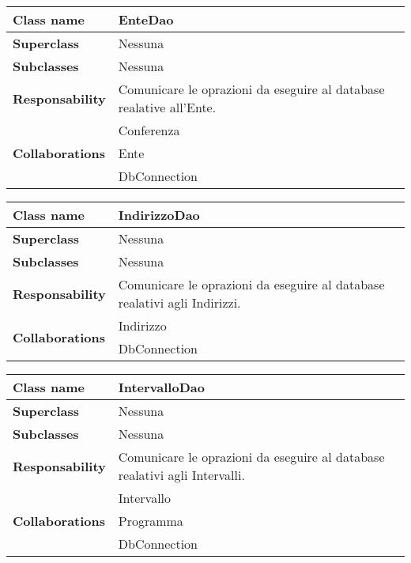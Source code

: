 \begin{table}[h!]
	\begin{tabular}{|l|l|}
		\hline 
		\textbf{Class name} & EnteDao
		\\ \hline
		\textbf{Superclass} & Nessuna
		\\ \hline
		\multirow{1}{*}{\textbf{Subclasses}} & Nessuna
		\\ \hline
		\textbf{Responsability} & Comunicare le oprazioni da eseguire al database realative all'Ente.
		\\ \hline
		\multirow{3}{*}{\textbf{Collaborations}} & Conferenza \\ 
		& Ente \\
		& DbConnection \\ \hline
	\end{tabular}
\end{table}

\begin{table}[h!]
	\begin{tabular}{|l|l|}
		\hline 
		\textbf{Class name} & IndirizzoDao
		\\ \hline
		\textbf{Superclass} & Nessuna
		\\ \hline
		\multirow{1}{*}{\textbf{Subclasses}} & Nessuna
		\\ \hline
		\textbf{Responsability} & Comunicare le oprazioni da eseguire al database realativi agli Indirizzi.
		\\ \hline
		\multirow{2}{*}{\textbf{Collaborations}} & Indirizzo \\ %
		& DbConnection \\
	\hline
	\end{tabular}
\end{table}	

\newpage

\begin{table}[h!]
	\begin{tabular}{|l|l|}
		\hline 
		\textbf{Class name} & IntervalloDao
		\\ \hline
		\textbf{Superclass} & Nessuna
		\\ \hline
		\multirow{1}{*}{\textbf{Subclasses}} & Nessuna
		\\ \hline
		\textbf{Responsability} & Comunicare le oprazioni da eseguire al database realativi agli Intervalli.
		\\ \hline
		\multirow{3}{*}{\textbf{Collaborations}} & Intervallo \\ 
		& Programma \\
		& DbConnection \\ \hline
	\end{tabular}
\end{table}

